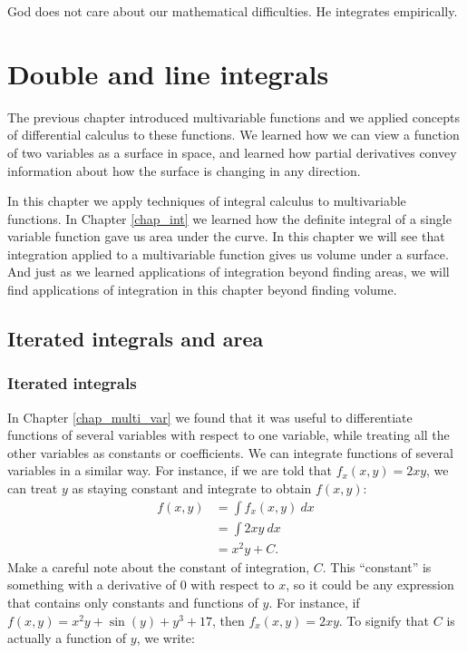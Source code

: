 \begin{savequote}[75mm]
God does not care about our mathematical difficulties. He integrates empirically.
\end{savequote}

\chapter{Double and line integrals}
\label{chap_double}
\graphicspath{{figures/Double/}{figures/Vector_Calc/}}

The previous chapter introduced multivariable functions and we applied concepts of differential calculus to these functions. We learned how we can view a function of two variables as a surface in space, and learned how partial derivatives convey  information about how the surface is changing in any direction.

In this chapter we apply techniques of integral calculus to multivariable functions. In Chapter \ref{chap_int} we learned how the definite integral of a single variable function gave us area under the curve. In this chapter we will see that integration applied to a multivariable function gives us volume under a surface. And just as we learned applications of integration beyond finding areas, we will find applications of integration in this chapter beyond finding volume.

\section{Iterated integrals and area}\label{sec:iterated_integrals}
\subsection{Iterated integrals}
In Chapter \ref{chap_multi_var} we found that it was useful to differentiate functions of several variables with respect to one variable, while treating all the other variables as constants or coefficients. We can integrate functions of several variables in a similar way. For instance, if we are told that $f_x(x,y) = 2xy$, we can treat $y$ as staying constant and integrate to obtain $f(x,y)$:
\begin{align*}
f(x,y) &= \int\limits f_x(x,y)\ dx\\[0.2cm]
				&= \int\limits 2xy\ dx \\[0.2cm]
				&= x^2y + C.
\end{align*}
Make a careful note about the constant of integration, $C$. This ``constant'' is something with a derivative of $0$ with respect to $x$, so it could be any expression that contains only constants and functions of $y$. For instance, if $f(x,y) = x^2y+ \sin (y) + y^3 + 17$, then $f_x(x,y) = 2xy$. To signify that $C$ is actually a function of $y$, we write:

